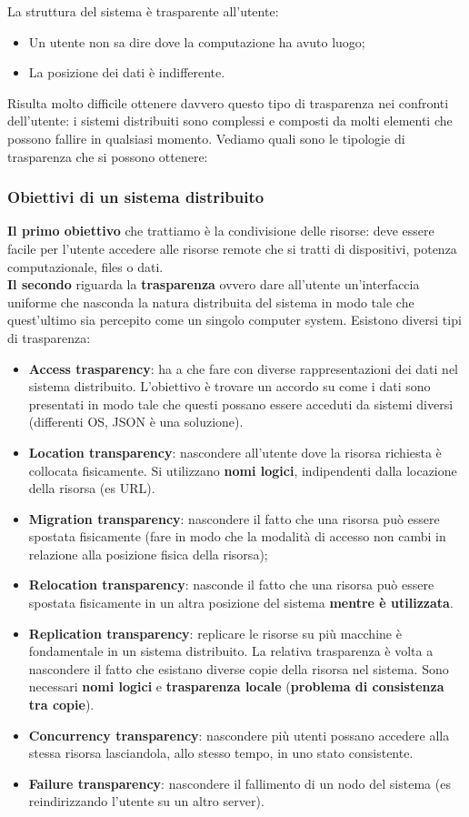 \documentclass[12pt]{article}
\begin{document}
		La struttura del sistema è trasparente all'utente:
		\begin{itemize}
			\item Un utente non sa dire dove la computazione ha avuto luogo;
			\item La posizione dei dati è indifferente.
		\end{itemize}
		Risulta molto difficile ottenere davvero questo tipo di trasparenza nei confronti dell'utente: i sistemi distribuiti sono complessi e composti da molti elementi che possono fallire in qualsiasi momento. Vediamo quali sono le tipologie di trasparenza che si possono ottenere:
	\subsubsection{Obiettivi di un sistema distribuito}
		\textbf{Il primo obiettivo} che trattiamo è la condivisione delle risorse: deve essere facile per l'utente accedere alle risorse remote che si tratti di dispositivi, potenza computazionale, files o dati.\\
		\textbf{Il secondo} riguarda la \textbf{trasparenza} ovvero dare all'utente un'interfaccia uniforme che nasconda la natura distribuita del sistema in modo tale che quest'ultimo sia percepito come un singolo computer system. Esistono diversi tipi di trasparenza:
		\begin{itemize}
			\item \textbf{Access trasparency}: ha a che fare con diverse rappresentazioni dei dati nel sistema distribuito. L'obiettivo è trovare un accordo su come i dati sono presentati in modo tale che questi possano essere acceduti da sistemi diversi (differenti OS, JSON è una soluzione).
			\item \textbf{Location transparency}: nascondere all'utente dove la risorsa richiesta è collocata fisicamente. Si utilizzano \textbf{nomi logici}, indipendenti dalla locazione della risorsa (es URL).
			\item \textbf{Migration transparency}: nascondere il fatto che una risorsa può essere spostata fisicamente (fare in modo che la modalità di accesso non cambi in relazione alla posizione fisica della risorsa);
			\item \textbf{Relocation transparency}: nasconde il fatto che una risorsa può essere spostata fisicamente in un altra posizione del sistema \textbf{mentre è utilizzata}.
			\item \textbf{Replication transparency}: replicare le risorse su più macchine è fondamentale in un sistema distribuito. La relativa trasparenza è volta a nascondere il fatto che esistano diverse copie della risorsa nel sistema. Sono necessari \textbf{nomi logici} e \textbf{trasparenza locale} (\textbf{problema di consistenza tra copie}).
			\item \textbf{Concurrency transparency}: nascondere più utenti possano accedere alla stessa risorsa lasciandola, allo stesso tempo, in uno stato consistente.
			\item \textbf{Failure transparency}: nascondere il fallimento di un nodo del sistema (es reindirizzando l'utente su un altro server).
		\end{itemize}
\end{document}
